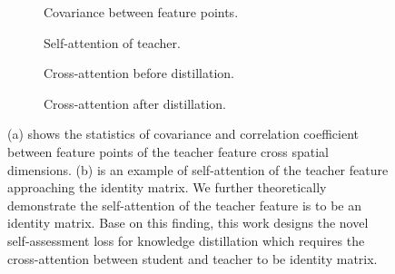 \documentclass[10pt,twocolumn,letterpaper]{article}
\begin{document}
\begin{figure}
  \centering
  \begin{subfigure}{0.45\linewidth}
    \fbox{\rule{0pt}{1in} \rule{.9\linewidth}{0pt}}
    \caption{Covariance between feature points.}
    \label{fig:short-a}
  \end{subfigure}
  \hfill
  \begin{subfigure}{0.45\linewidth}
    \fbox{\rule{0pt}{1in} \rule{.9\linewidth}{0pt}}
    \caption{Self-attention of teacher.}
    \label{fig:short-b}
  \end{subfigure}
  \vfill
  \begin{subfigure}{0.45\linewidth}
    \fbox{\rule{0pt}{1in} \rule{.9\linewidth}{0pt}}
    \caption{Cross-attention before distillation.}
    \label{fig:short-c}
  \end{subfigure}
  \hfill
  \begin{subfigure}{0.45\linewidth}
    \fbox{\rule{0pt}{1in} \rule{.9\linewidth}{0pt}}
    \caption{Cross-attention after distillation.}
    \label{fig:short-d}
  \end{subfigure}
  \caption{(a) shows the statistics of covariance and correlation coefficient between feature points of the teacher feature cross spatial dimensions. (b) is an example of self-attention of the teacher feature approaching the identity matrix. We further theoretically demonstrate the self-attention of the teacher feature is to be an identity matrix. Base on this finding, this work designs the novel self-assessment loss for knowledge distillation which requires the cross-attention between student and teacher to be identity matrix. }
  \label{fig:short}
\end{figure}

\end{document}
